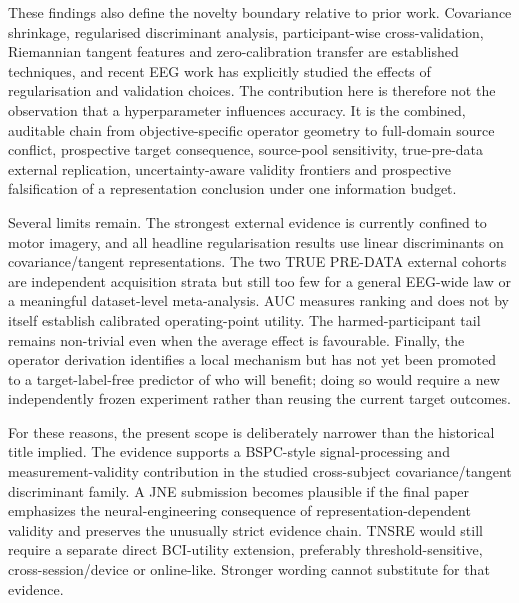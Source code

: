 These findings also define the novelty boundary relative to prior work.
Covariance shrinkage, regularised discriminant analysis, participant-wise
cross-validation, Riemannian tangent features and zero-calibration transfer
are established techniques, and recent EEG work has explicitly studied the
effects of regularisation and validation choices. The contribution here is
therefore not the observation that a hyperparameter influences accuracy. It
is the combined, auditable chain from objective-specific operator geometry to
full-domain source conflict, prospective target consequence, source-pool
sensitivity, true-pre-data external replication, uncertainty-aware validity
frontiers and prospective falsification of a representation conclusion under
one information budget.

Several limits remain. The strongest external evidence is currently confined
to motor imagery, and all headline regularisation results use linear
discriminants on covariance/tangent representations. The two TRUE PRE-DATA
external cohorts are independent acquisition strata but still too few for a
general EEG-wide law or a meaningful dataset-level meta-analysis. AUC measures
ranking and does not by itself establish calibrated operating-point utility.
The harmed-participant tail remains non-trivial even when the average effect
is favourable. Finally, the operator derivation identifies a local mechanism
but has not yet been promoted to a target-label-free predictor of who will
benefit; doing so would require a new independently frozen experiment rather
than reusing the current target outcomes.

For these reasons, the present scope is deliberately narrower than the
historical title implied. The evidence supports a BSPC-style
signal-processing and measurement-validity contribution in the studied
cross-subject covariance/tangent discriminant family. A JNE submission becomes
plausible if the final paper emphasizes the neural-engineering consequence of
representation-dependent validity and preserves the unusually strict evidence
chain. TNSRE would still require a separate direct BCI-utility extension,
preferably threshold-sensitive, cross-session/device or online-like. Stronger
wording cannot substitute for that evidence.
